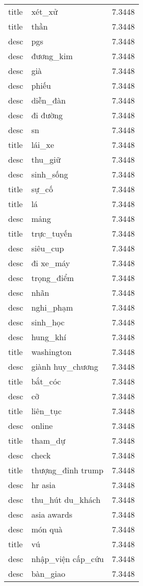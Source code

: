 \documentclass{article}
\begin{document}
\begin{tabular}{lll}
title & xét\_xử & 7.3448\\
title & thần & 7.3448\\
desc & pgs & 7.3448\\
desc & đương\_kim & 7.3448\\
desc & già & 7.3448\\
desc & phiếu & 7.3448\\
desc & diễn\_đàn & 7.3448\\
desc & đi đường & 7.3448\\
desc & sn & 7.3448\\
title & lái\_xe & 7.3448\\
desc & thu\_giữ & 7.3448\\
desc & sinh\_sống & 7.3448\\
title & sự\_cố & 7.3448\\
title & lá & 7.3448\\
desc & mảng & 7.3448\\
title & trực\_tuyến & 7.3448\\
desc & siêu\_cup & 7.3448\\
desc & đi xe\_máy & 7.3448\\
desc & trọng\_điểm & 7.3448\\
desc & nhãn & 7.3448\\
desc & nghi\_phạm & 7.3448\\
desc & sinh\_học & 7.3448\\
desc & hung\_khí & 7.3448\\
title & washington & 7.3448\\
desc & giành huy\_chương & 7.3448\\
title & bắt\_cóc & 7.3448\\
desc & cỡ & 7.3448\\
title & liên\_tục & 7.3448\\
desc & online & 7.3448\\
title & tham\_dự & 7.3448\\
desc & check & 7.3448\\
title & thượng\_đỉnh trump & 7.3448\\
desc & hr asia & 7.3448\\
desc & thu\_hút du\_khách & 7.3448\\
desc & asia awards & 7.3448\\
desc & món quà & 7.3448\\
title & vú & 7.3448\\
desc & nhập\_viện cấp\_cứu & 7.3448\\
desc & bàn\_giao & 7.3448\\

\end{tabular}
\end{document}
